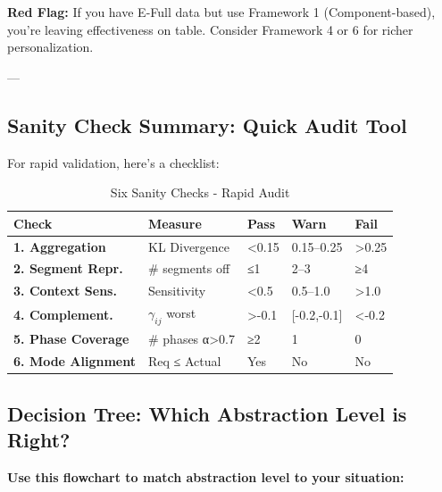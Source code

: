 \textbf{Red Flag:} If you have E-Full data but use Framework 1 (Component-based), you're leaving effectiveness on table. Consider Framework 4 or 6 for richer personalization.

---

\subsection{Sanity Check Summary: Quick Audit Tool}

For rapid validation, here's a checklist:

\begin{table}[htbp]
\centering
\caption{Six Sanity Checks - Rapid Audit}
\label{tab:20-sanity-checks}
\renewcommand{\arraystretch}{1.2}
\footnotesize
\begin{tabular}{@{}lllll@{}}
\toprule
\textbf{Check} & \textbf{Measure} & \textbf{Pass} & \textbf{Warn} & \textbf{Fail} \\
\midrule
\textbf{1. Aggregation} & KL Divergence & <0.15 & 0.15--0.25 & >0.25 \\
\textbf{2. Segment Repr.} & \# segments off & ≤1 & 2--3 & ≥4 \\
\textbf{3. Context Sens.} & Sensitivity & <0.5 & 0.5--1.0 & >1.0 \\
\textbf{4. Complement.} & $\gamma_{ij}$ worst & >-0.1 & [-0.2,-0.1] & <-0.2 \\
\textbf{5. Phase Coverage} & \# phases α>0.7 & ≥2 & 1 & 0 \\
\textbf{6. Mode Alignment} & Req ≤ Actual & Yes & No & No \\
\bottomrule
\end{tabular}
\end{table}

\subsection{Decision Tree: Which Abstraction Level is Right?}
\label{subsec:20-decision-tree}

\textbf{Use this flowchart to match abstraction level to your situation:}

\vspace{0.5cm}

